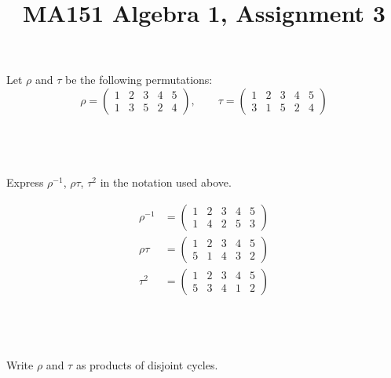 \documentclass[a4paper]{article}
\title{MA151 Algebra 1, Assignment 3}
\begin{document}
\maketitle

\setlength{\parindent}{0em}
\setlength{\parskip}{1em}

\renewcommand{\thesubsection}{Q\arabic{section}~\roman{subsection}.}

\begin{questionbody}
Let $\rho$ and $\tau$ be the following permutations: \[
\rho = \begin{pmatrix}1 & 2 & 3 & 4 & 5 \\ 1 & 3 & 5 & 2 & 4\end{pmatrix},
\qquad \tau = \begin{pmatrix}1 & 2 & 3 & 4 & 5 \\ 3 & 1 & 5 & 2 & 4\end{pmatrix}
\]
\end{questionbody}

\subsection{~} %

\begin{questionbody}
Express $\rho^{−1}$, $\rho \tau$, $\tau^2$ in the notation used above.
\end{questionbody}

\begin{align*}
    \rho^{-1} &= \begin{pmatrix}1 & 2 & 3 & 4 & 5 \\ 1 & 4 & 2 & 5 & 3\end{pmatrix} \\[1ex]
    \rho\tau  &= \begin{pmatrix}1 & 2 & 3 & 4 & 5 \\ 5 & 1 & 4 & 3 & 2\end{pmatrix} \\[1ex]
    \tau^2    &= \begin{pmatrix}1 & 2 & 3 & 4 & 5 \\ 5 & 3 & 4 & 1 & 2\end{pmatrix}
\end{align*}

\subsection{~} %

\begin{questionbody}
Write $\rho$ and $\tau$ as products of disjoint cycles.
\end{questionbody}
\end{document}
